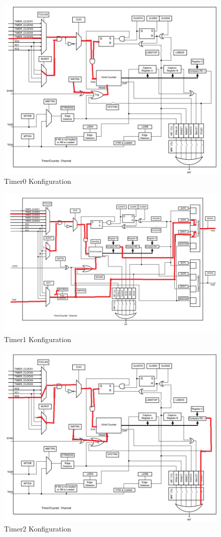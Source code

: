 \documentclass[12pt]{article}
\begin{document}
\begin{figure}
    \includegraphics[width=\textwidth]{Timer0.png}
    \caption{Timer0 Konfiguration}
\end{figure}
\begin{figure}
    \includegraphics[width=\textwidth]{Timer1.png}
    \caption{Timer1 Konfiguration}
\end{figure}
\begin{figure}
    \includegraphics[width=\textwidth]{Timer2.png}
    \caption{Timer2 Konfiguration}
\end{figure}
\end{document}
